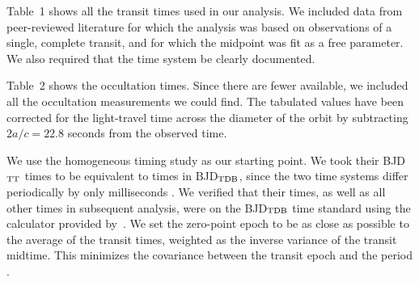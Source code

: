 \documentclass[12pt,twocolumn,tighten]{aastex62}
\begin{document}
Table~1 shows all the transit times used in our
analysis.  We included data from peer-reviewed literature for which
the analysis was based on observations of a single, complete transit,
and for which the midpoint was fit as a free parameter. We also
required that the time system be clearly documented.

Table~2 shows the occultation times.  Since there are fewer available,
we included all the occultation measurements we could find. The
tabulated values have been corrected for the light-travel time across
the diameter of the orbit by subtracting $2a/c = 22.8$ seconds from
the observed time.

We use the homogeneous \citet{hoyer_tramos_2013} timing
study as our
starting point.  We took their BJD$_{\rm TT}$ times to be equivalent
to times in BJD$_{\rm TDB}$, since the two time systems differ
periodically by only milliseconds \citep{urban_explanatory_2012}.  We
verified that their times, as well as all other times in subsequent
analysis, were on the BJD$_{\rm TDB}$ time standard using the
calculator provided by~\citet{eastman_achieving_2010}.  We set the
zero-point epoch to be as close as possible to the average of the
transit times, weighted as the inverse variance of the transit
midtime. This minimizes the covariance between the transit epoch and
the period \citep{gibson_gemini_2013}.
\end{document}
